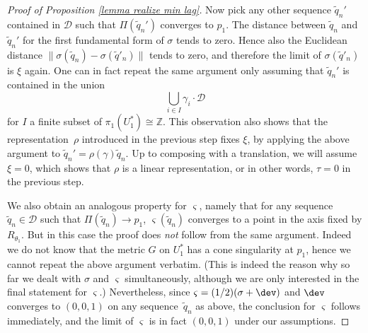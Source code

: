\begin{proof}[Proof of Proposition \ref{lemma realize min lag}]
Now pick any other sequence $\widetilde q_n'$ contained in $\mathcal D$ such that $\Pi(\widetilde q_n')$ converges to $p_1$. The distance between $\widetilde q_n$ and $\widetilde q_n'$ for the first fundamental form of $\sigma$ tends to zero. Hence also the Euclidean distance $\| \sigma(\widetilde q_n)- \sigma(\widetilde q'_n)\|$ tends to zero, and therefore the limit of $ \sigma(\widetilde q'_n)$ is $\xi$ again. One can in fact repeat the same argument only assuming that $\widetilde q_n'$ is contained in the union
\[
\bigcup_{i\in I} \gamma_i\cdot\mathcal D
\]
for $I$ a finite subset of $\pi_1(U_1^*)\cong\mathbb Z$. This observation also shows that the representation~$\rho$ introduced in the previous step fixes $\xi$, by applying the above argument to $\widetilde q_n'=\rho(\gamma)\widetilde q_n$. Up to composing with a translation, we will assume $\xi=0$, which shows that $\rho$ is a linear representation, or in other words, $\tau=0$ in the previous step.

We also obtain an analogous property for $\varsigma$, namely that for any sequence $\widetilde q_n\in\mathcal D$ such that $\Pi(\widetilde q_n)\to p_1$, $\varsigma (\widetilde q_n)$ converges to a point in the axis fixed by $R_{\theta_1}$. But in this case the proof does \emph{not} follow from the same argument. Indeed we do not know that the metric $G$ on $U_1^*$ has a cone singularity at $p_1$, hence we cannot repeat the above argument verbatim. (This is indeed the reason why so far we dealt with $\sigma$ and $\varsigma$ simultaneously, although we are only interested in the final statement for $\varsigma$.)
Nevertheless, since $\varsigma=(1/2)(\sigma+\dev)$ and $\dev$ converges to $(0,0,1)$ on any sequence~$\widetilde q_n$ as above, the conclusion for $\varsigma$ follows immediately, and the limit of $\varsigma$ is in fact $(0,0,1)$ under our assumptions.


\end{proof}

